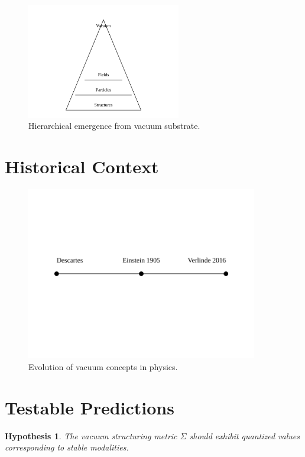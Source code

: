 \documentclass[12pt,a4paper]{article}
\newcommand{\structuring}{\Sigma}
\newtheorem{hypothesis}{Hypothesis}
\begin{document}
\begin{figure}[h]
\centering
\includegraphics[width=0.6\textwidth]{../figures/fig4_hierarchy.svg}
\caption{Hierarchical emergence from vacuum substrate.}
\label{fig:hierarchy}
\end{figure}

\section{Historical Context}

\begin{figure}[h]
\centering
\includegraphics[width=0.9\textwidth]{../figures/fig1_timeline.svg}
\caption{Evolution of vacuum concepts in physics.}
\label{fig:timeline}
\end{figure}

\section{Testable Predictions}

\begin{hypothesis}
The vacuum structuring metric $\structuring$ should exhibit quantized values corresponding to stable modalities.
\end{hypothesis}
\end{document}

